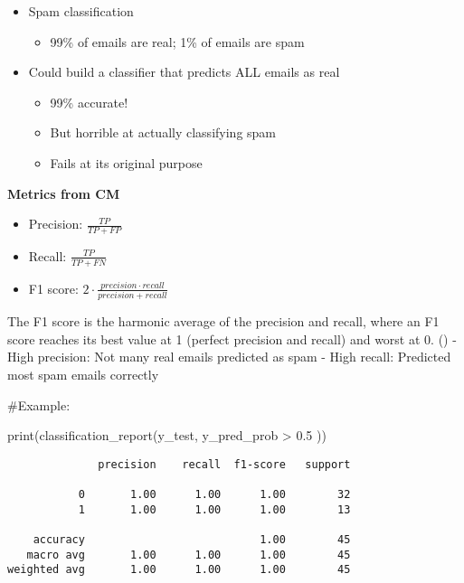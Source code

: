 \documentclass[
  letterpaper,
  DIV=11,
  numbers=noendperiod]{scrreprt}
\newenvironment{Shaded}{\begin{snugshade}}{\end{snugshade}}
\newcommand{\BuiltInTok}[1]{\textcolor[rgb]{0.00,0.23,0.31}{#1}}
\newcommand{\CommentTok}[1]{\textcolor[rgb]{0.37,0.37,0.37}{#1}}
\newcommand{\FloatTok}[1]{\textcolor[rgb]{0.68,0.00,0.00}{#1}}
\newcommand{\NormalTok}[1]{\textcolor[rgb]{0.00,0.23,0.31}{#1}}
\newcommand{\OperatorTok}[1]{\textcolor[rgb]{0.37,0.37,0.37}{#1}}
\providecommand{\tightlist}{%
  \setlength{\itemsep}{0pt}\setlength{\parskip}{0pt}}\usepackage{longtable,booktabs,array}
\begin{document}
\begin{itemize}
\tightlist
\item
  Spam classification

  \begin{itemize}
  \tightlist
  \item
    99\% of emails are real; 1\% of emails are spam
  \end{itemize}
\item
  Could build a classifier that predicts ALL emails as real

  \begin{itemize}
  \tightlist
  \item
    99\% accurate!
  \item
    But horrible at actually classifying spam
  \item
    Fails at its original purpose
  \end{itemize}
\end{itemize}

\textbf{Metrics from CM}

\begin{itemize}
\tightlist
\item
  Precision: \(\frac{TP}{TP+FP}\)
\item
  Recall: \(\frac{TP}{TP+FN}\)
\item
  F1 score:
  \(2 \cdot \frac{precision \cdot recall}{precision + recall}\)
\end{itemize}

The F1 score is the harmonic average of the precision and recall, where
an F1 score reaches its best value at 1 (perfect precision and recall)
and worst at 0. () - High precision: Not many real emails predicted as
spam - High recall: Predicted most spam emails correctly

\begin{Shaded}
\begin{Highlighting}[]
\CommentTok{\#Example:}
\end{Highlighting}
\end{Shaded}

\begin{Shaded}
\begin{Highlighting}[]
\BuiltInTok{print}\NormalTok{(classification\_report(y\_test, y\_pred\_prob }\OperatorTok{\textgreater{}} \FloatTok{0.5}\NormalTok{ ))}
\end{Highlighting}
\end{Shaded}

\begin{verbatim}
              precision    recall  f1-score   support

           0       1.00      1.00      1.00        32
           1       1.00      1.00      1.00        13

    accuracy                           1.00        45
   macro avg       1.00      1.00      1.00        45
weighted avg       1.00      1.00      1.00        45
\end{verbatim}
\end{document}
